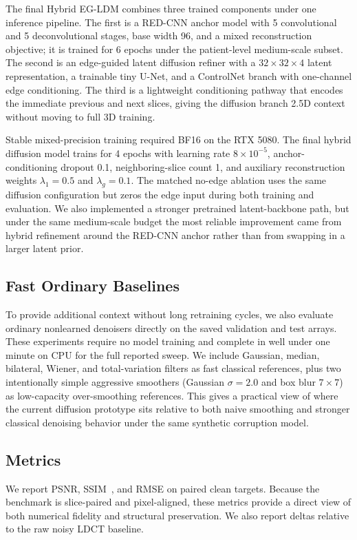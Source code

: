 \documentclass{article}
\newcommand{\hybrid}{Hybrid EG-LDM}
\begin{document}
The final \hybrid{} combines three trained components under one inference pipeline. The first is a RED-CNN anchor model with 5 convolutional and 5 deconvolutional stages, base width 96, and a mixed reconstruction objective; it is trained for 6 epochs under the patient-level medium-scale subset. The second is an edge-guided latent diffusion refiner with a $32 \times 32 \times 4$ latent representation, a trainable tiny U-Net, and a ControlNet branch with one-channel edge conditioning. The third is a lightweight conditioning pathway that encodes the immediate previous and next slices, giving the diffusion branch 2.5D context without moving to full 3D training.

Stable mixed-precision training required BF16 on the RTX 5080. The final hybrid diffusion model trains for 4 epochs with learning rate $8\times 10^{-5}$, anchor-conditioning dropout 0.1, neighboring-slice count 1, and auxiliary reconstruction weights $\lambda_1=0.5$ and $\lambda_g=0.1$. The matched no-edge ablation uses the same diffusion configuration but zeros the edge input during both training and evaluation. We also implemented a stronger pretrained latent-backbone path, but under the same medium-scale budget the most reliable improvement came from hybrid refinement around the RED-CNN anchor rather than from swapping in a larger latent prior.

\subsection{Fast Ordinary Baselines}
To provide additional context without long retraining cycles, we also evaluate ordinary nonlearned denoisers directly on the saved validation and test arrays. These experiments require no model training and complete in well under one minute on CPU for the full reported sweep. We include Gaussian, median, bilateral, Wiener, and total-variation filters as fast classical references, plus two intentionally simple aggressive smoothers (Gaussian $\sigma=2.0$ and box blur $7 \times 7$) as low-capacity over-smoothing references. This gives a practical view of where the current diffusion prototype sits relative to both naive smoothing and stronger classical denoising behavior under the same synthetic corruption model.

\subsection{Metrics}
We report PSNR, SSIM~\cite{wang2004ssim}, and RMSE on paired clean targets. Because the benchmark is slice-paired and pixel-aligned, these metrics provide a direct view of both numerical fidelity and structural preservation. We also report deltas relative to the raw noisy LDCT baseline.
\end{document}

